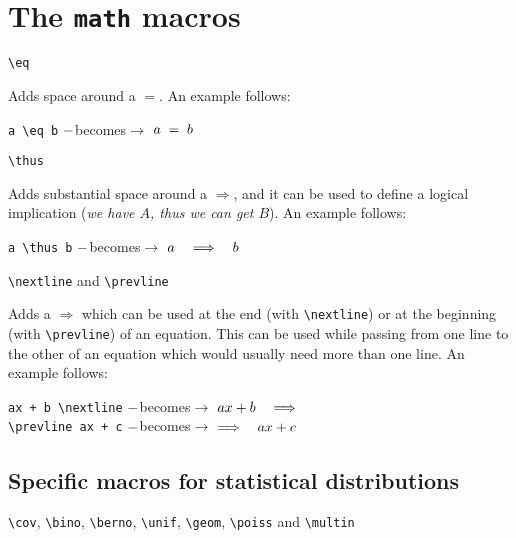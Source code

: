 \documentclass[]{notex}
\newcommand{\becomes}[1]{\hspace{#1} $\--$becomes$\rightarrow$ \hspace{#1}}
\begin{document}
\section{The \texttt{math} macros}

\begin{tcolorbox}
    \verb|\eq|
\end{tcolorbox}

\noindent Adds space around a $=$. An example follows:
\begin{center}
    \verb|a \eq b| \becomes{20pt} $a \; = \; b$
\end{center}

\begin{tcolorbox}
    \verb|\thus|
\end{tcolorbox}

\noindent Adds substantial space around a $\Longrightarrow$, and it can be used to define a logical implication (\textit{we have $A$, thus we can get $B$}). An example follows:
\begin{center}
    \verb|a \thus b| \becomes{20pt} $a \quad \Longrightarrow \quad b$
\end{center}

\begin{tcolorbox}
    \verb|\nextline| and \verb|\prevline|
\end{tcolorbox}

\noindent Adds a $\Longrightarrow$ which can be used at the end (with \verb|\nextline|) or at the beginning (with \verb|\prevline|) of an equation. This can be used while passing from one line to the other of an equation which would usually need more than one line. An example follows:
\begin{center}
    \verb|ax + b \nextline| \becomes{20pt} $ax + b \quad \Longrightarrow$ \\
    \verb|\prevline ax + c| \becomes{20pt} $\Longrightarrow \quad ax + c$
\end{center}

\subsection{Specific macros for statistical distributions}

\begin{tcolorbox}
    \verb|\cov|, \verb|\bino|, \verb|\berno|, \verb|\unif|, \verb|\geom|, \verb|\poiss| and \verb|\multin|
\end{tcolorbox}
\end{document}
